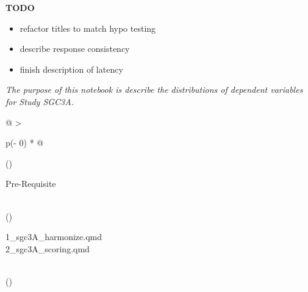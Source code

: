 \documentclass[
  letterpaper,
  DIV=11,
  numbers=noendperiod]{scrreprt}
\providecommand{\tightlist}{%
  \setlength{\itemsep}{0pt}\setlength{\parskip}{0pt}}\usepackage{longtable,booktabs,array}
\begin{document}
\textbf{TODO}

\begin{itemize}
\tightlist
\item
  refactor titles to match hypo testing
\item
  describe response consistency
\item
  finish description of latency
\end{itemize}

\emph{The purpose of this notebook is describe the distributions of
dependent variables for Study SGC3A.}

\begin{longtable}[]{@{}
  >{\raggedright\arraybackslash}p{(\columnwidth - 0\tabcolsep) * }@{}}
\toprule()
\begin{minipage}[b]{\linewidth}\raggedright
Pre-Requisite
\end{minipage} \\
\midrule()
\endhead
\begin{minipage}[t]{\linewidth}\raggedright
1\_sgc3A\_harmonize.qmd\\
2\_sgc3A\_scoring.qmd\strut
\end{minipage} \\
\bottomrule()
\end{longtable}
\end{document}
